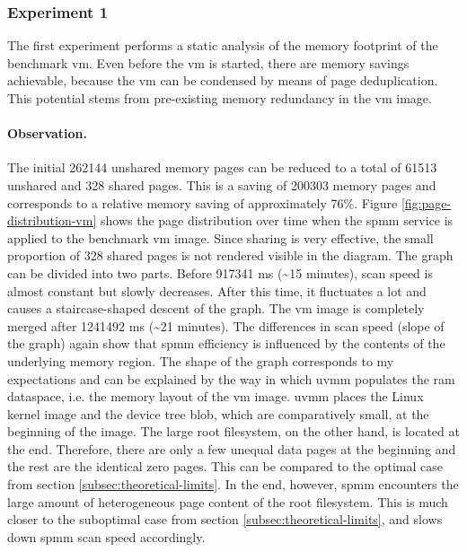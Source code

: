 \subsubsection*{Experiment 1}
\label{subsubsec:ex1}

The first experiment performs a static analysis of the memory footprint of the benchmark \ac{vm}.
Even before the \ac{vm} is started, there are memory savings achievable, because the \ac{vm} can be condensed by means of page deduplication.
This potential stems from pre-existing memory redundancy in the \ac{vm} image.

\paragraph{Observation.}

The initial 262144 unshared memory pages can be reduced to a total of 61513 unshared and 328 shared pages.
This is a saving of 200303 memory pages and corresponds to a relative memory saving of approximately 76\%.
Figure \ref{fig:page-distribution-vm} shows the page distribution over time when the \ac{spmm} service is applied to the benchmark \ac{vm} image.
Since sharing is very effective, the small proportion of 328 shared pages is not rendered visible in the diagram.
The graph can be divided into two parts.
Before 917341 ms (\textasciitilde{}15 minutes), scan speed is almost constant but slowly decreases.
After this time, it fluctuates a lot and causes a staircase-shaped descent of the graph.
The \ac{vm} image is completely merged after 1241492 ms (\textasciitilde{}21 minutes).
The differences in scan speed (slope of the graph) again show that \ac{spmm} efficiency is influenced by the contents of the underlying memory region.
The shape of the graph corresponds to my expectations and can be explained by the way in which \ac{uvmm} populates the \ac{ram} dataspace, i.e. the memory layout of the \ac{vm} image.
\Ac{uvmm} places the Linux kernel image and the device tree blob, which are comparatively small, at the beginning of the image.
The large root filesystem, on the other hand, is located at the end.
Therefore, there are only a few unequal data pages at the beginning and the rest are the identical zero pages.
This can be compared to the optimal case from section \ref{subsec:theoretical-limits}.
In the end, however, \ac{spmm} encounters the large amount of heterogeneous page content of the root filesystem.
This is much closer to the suboptimal case from section \ref{subsec:theoretical-limits}, and slows down \ac{spmm} scan speed accordingly.

